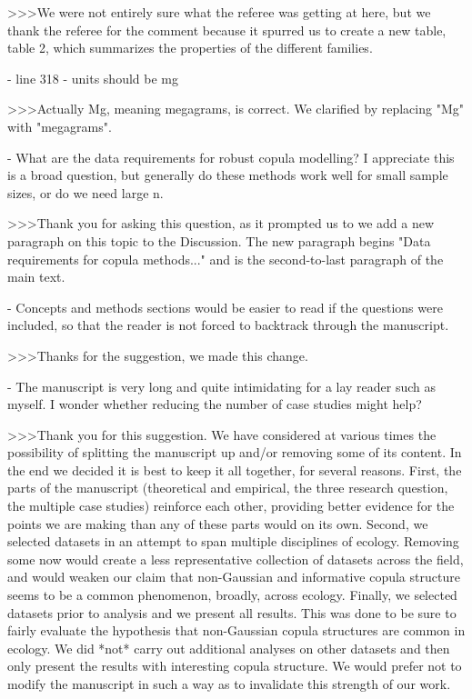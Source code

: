 >>>We were not entirely sure what the referee was getting at here, but we
thank the referee for the comment because it spurred us to create a new table,
table 2, which summarizes the properties of the different families.

- line 318 - units should be mg

>>>Actually Mg, meaning megagrams, is correct. We clarified by replacing "Mg"
with "megagrams".

- What are the data requirements for robust copula modelling? I appreciate this
is a broad question, but generally do these methods work well for small sample
sizes, or do we need large n.

>>>Thank you for asking this question, as it prompted us to we add a new paragraph
on this topic to the Discussion. The new paragraph begins "Data requirements for
copula methods..." and is the second-to-last paragraph of the main text.

- Concepts and methods sections would be easier to read if the questions were
included, so that the reader is not forced to backtrack through the manuscript.

>>>Thanks for the suggestion, we made this change.

- The manuscript is very long and quite intimidating for a lay reader such as myself. I wonder whether reducing the number of case studies might help?

>>>Thank you for this suggestion. We have considered at various times the possibility
of splitting the manuscript up
and/or removing some of its content. In the end we decided it is best to keep it all together,
for several reasons. First, the parts of the manuscript (theoretical and empirical, the three
research question, the multiple case studies) reinforce each other, providing better evidence
for the points we are making than any of these parts would on its own. Second,
we selected datasets in an attempt to span multiple disciplines of ecology.
Removing some now would create a less representative collection 
of datasets across the field, and would weaken
our claim that non-Gaussian and informative 
copula structure seems to be a common phenomenon, broadly, across ecology.
Finally, we selected datasets prior to analysis and we present all results. This was done
to be sure to fairly evaluate the hypothesis that non-Gaussian copula structures are
common in ecology. We did *not* carry out additional analyses on other datasets and
then only present the results with interesting copula structure. We would prefer not to
modify the manuscript in such a way as to invalidate this strength of our work.

